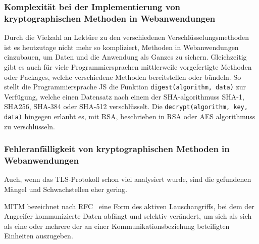 \subsubsection{Komplexität bei der Implementierung von kryptographischen Methoden in Webanwendungen}\label{subsubsec:komplexität_bei_der_implementierung_von_kryptographischen_methoden_in_webanwendungen}
Durch die Vielzahl an Lektüre zu den verschiedenen Verschlüsselungsmethoden\autocites[\zb][]{davies2011implementing} ist es heutzutage nicht mehr so kompliziert,  Methoden in Webanwendungen einzubauen, um Daten und die Anwendung als Ganzes zu sichern.
Gleichzeitig gibt es auch für viele Programmiersprachen mittlerweile vorgefertigte Methoden oder Packages, welche verschiedene  Methoden bereitstellen oder bündeln. So stellt die Programmiersprache \ac{JS} die Funktion \lstinline!digest(algorithm, data)! zur Verfügung, welche einen Datensatz nach einem der \ac{SHA}-\glspl{algorithmus} \ac{SHA}-1, \gls{SHA256}, \ac{SHA}-384 oder \ac{SHA}-512 verschlüsselt.\autocite[\vglf][]{SubtleCr83:online} Die \lstinline!decrypt(algorithm, key, data)! hingegen erlaubt es, mit RSA, beschrieben in \ac{RSA} oder \ac{AES} \glspl{algorithmus} zu verschlüsseln.

\subsubsection{Fehleranfälligkeit von kryptographischen Methoden in Webanwendungen}\label{subsubsec:fehleranfälligkeit_von_kryptographischen_methoden_in_webanwendungen}
Auch, wenn das \ac{TLS}-Protokoll schon viel analysiert wurde\autocites[Siehe \zb][]{krawczyk2013security, paulson1999inductive, dowling2015cryptographic, cremers2017comprehensive}, sind die gefundenen Mängel und Schwachstellen eher gering.\autocite[\vglf][]{OPPLIGER20062238} 

\begin{definition}
    \ac{MITM} bezeichnet nach \ac{RFC}\  \autocite[Übersetzt aus][]{rfc2828} eine Form des aktiven Lauschangriffs, bei dem der Angreifer kommunizierte Daten abfängt und selektiv verändert, um sich als sich als eine oder mehrere der an einer Kommunikationsbeziehung beteiligten Einheiten auszugeben.
\end{definition}

